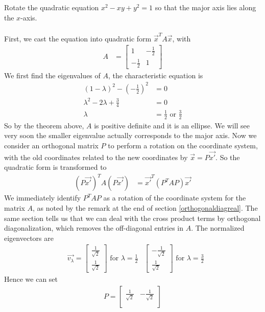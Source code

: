 \begin{exmp}
Rotate the quadratic equation $x^2 - xy + y^2 = 1$ so that the major axis lies along the $x$-axis. \\
\\
First, we cast the equation into quadratic form $\vec{x}^T A\vec{x}$, with
\begin{align*}
A &=
\begin{bmatrix}
1 & -\frac{1}{2} \\
-\frac{1}{2} & 1
\end{bmatrix}
\end{align*}
We first find the eigenvalues of $A$, the characteristic equation is
\begin{align*}
(1-\lambda)^2 - (-\frac{1}{2})^2 &= 0 \\
\lambda^2 - 2\lambda + \frac{3}{4} &= 0 \\
\lambda &= \frac{1}{2} \text{ or } \frac{3}{2}
\end{align*}
So by the theorem above, $A$ is positive definite and it is an ellipse. We will see very soon the smaller eigenvalue actually corresponds to the major axis. Now we consider an orthogonal matrix $P$ to perform a rotation on the coordinate system, with the old coordinates related to the new coordinates by $\vec{x} = P\vec{x'}$. So the quadratic form is transformed to
\begin{align*}
(P\vec{x'})^T A (P\vec{x'}) &= \vec{x'}^T (P^T AP) \vec{x'}
\end{align*}
We immediately identify $P^T AP$ as a rotation of the coordinate system for the matrix $A$, as noted by the remark at the end of section \ref{orthogonaldiagreal}. The same section tells us that we can deal with the cross product terms by orthogonal diagonalization, which removes the off-diagonal entries in $A$. The normalized eigenvectors are
\begin{align*}
&\vec{v_\lambda} = \begin{bmatrix}
\frac{1}{\sqrt{2}} \\
\frac{1}{\sqrt{2}}
\end{bmatrix}
\text{ for } \lambda = \frac{1}{2}
& \begin{bmatrix}
-\frac{1}{\sqrt{2}} \\
\frac{1}{\sqrt{2}}
\end{bmatrix}
\text{ for } \lambda = \frac{3}{2}
\end{align*}
Hence we can set 
\begin{align*}
P =
\begin{bmatrix}
\frac{1}{\sqrt{2}} & -\frac{1}{\sqrt{2}} \\

\end{bmatrix}
\end{align*}
\end{exmp}
